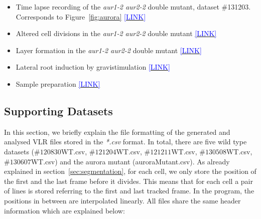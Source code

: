 \documentclass[11pt,a4paper, final]{article}
\begin{document}
\begin{itemize}
  \item Time lapse recording of the \emph{aur1-2 aur2-2} double mutant, dataset \#131203. Corresponds to Figure~\ref{fig:aurora} \href{http://youtu.be/y8b-0J4lPHg}{\textcolor{blue}{[LINK]}}
  \item Altered cell divisions in the \emph{aur1-2 aur2-2} double mutant \href{http://youtu.be/kkQZub-puVI}{\textcolor{blue}{[LINK]}}
  \item Layer formation in the \emph{aur1-2 aur2-2} double mutant \href{http://youtu.be/FH5BJ177TGk}{\textcolor{blue}{[LINK]}}
  \item Lateral root induction by gravistimulation \href{http://youtu.be/sLvVCbWye-E}{\textcolor{blue}{[LINK]}}
  \item Sample preparation \href{https://youtu.be/uFdOIjmO9vI}{\textcolor{blue}{[LINK]}}
\end{itemize}

\clearpage
\subsection{Supporting Datasets}
\noindent
In this section, we briefly explain the file formatting of the generated and analysed VLR files stored in the \textit{*.csv} format. In total, there are five wild type datasets ($\#120830$WT.csv, $\#121204$WT.csv, $\#121211$WT.csv, $\#130508$WT.csv, $\#130607$WT.csv) and the aurora mutant (auroraMutant.csv). As already explained in section~\ref{sec:segmentation}, for each cell, we only store the position of the first and the last frame before it divides. This means that for each cell a pair of lines is stored referring to the first and last tracked frame. In the program, the positions in between are interpolated linearly. All files share the same header information which are explained below:
\end{document}
